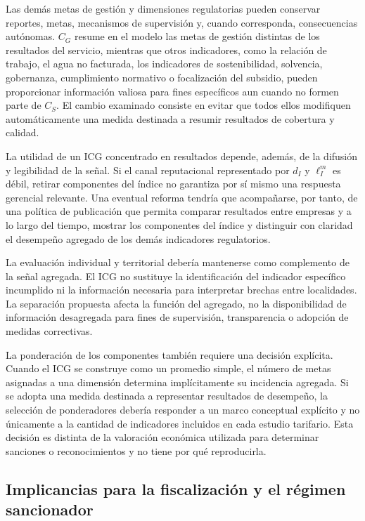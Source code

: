 Las demás metas de gestión y dimensiones regulatorias pueden conservar reportes, metas, mecanismos de supervisión y, cuando corresponda, consecuencias autónomas. \(C_G\) resume en el modelo las metas de gestión distintas de los resultados del servicio, mientras que otros indicadores, como la relación de trabajo, el agua no facturada, los indicadores de sostenibilidad, solvencia, gobernanza, cumplimiento normativo o focalización del subsidio, pueden proporcionar información valiosa para fines específicos aun cuando no formen parte de \(C_S\). El cambio examinado consiste en evitar que todos ellos modifiquen automáticamente una medida destinada a resumir resultados de cobertura y calidad.

La utilidad de un ICG concentrado en resultados depende, además, de la difusión y legibilidad de la señal. Si el canal reputacional representado por \(d_I\) y \(\ell_I^{m}\) es débil, retirar componentes del índice no garantiza por sí mismo una respuesta gerencial relevante. Una eventual reforma tendría que acompañarse, por tanto, de una política de publicación que permita comparar resultados entre empresas y a lo largo del tiempo, mostrar los componentes del índice y distinguir con claridad el desempeño agregado de los demás indicadores regulatorios.

La evaluación individual y territorial debería mantenerse como complemento de la señal agregada. El ICG no sustituye la identificación del indicador específico incumplido ni la información necesaria para interpretar brechas entre localidades. La separación propuesta afecta la función del agregado, no la disponibilidad de información desagregada para fines de supervisión, transparencia o adopción de medidas correctivas.

La ponderación de los componentes también requiere una decisión explícita. Cuando el ICG se construye como un promedio simple, el número de metas asignadas a una dimensión determina implícitamente su incidencia agregada. Si se adopta una medida destinada a representar resultados de desempeño, la selección de ponderadores debería responder a un marco conceptual explícito y no únicamente a la cantidad de indicadores incluidos en cada estudio tarifario. Esta decisión es distinta de la valoración económica utilizada para determinar sanciones o reconocimientos y no tiene por qué reproducirla.


\subsection{Implicancias para la fiscalización y el régimen sancionador}
\label{subsec:implicancias_fiscalizacion_sanciones}

